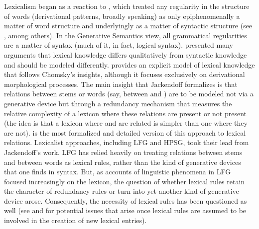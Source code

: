 \documentclass[output=paper
 	        ,biblatex
                ,babelshorthands
                ,newtxmath
                ,draftmode
                ,colorlinks, citecolor=brown
]{langscibook}
\begin{document}
Lexicalism began as a reaction to , which treated any regularity in the
structure of words (derivational patterns, broadly speaking) as only epiphenomenally a matter of
word structure and underlyingly as a matter of syntactic structure (see \citealt{Lakoff1970}, among
others). In the Generative Semantics view, all grammatical regularities are a matter of syntax (much
of it, in fact, logical syntax). \citet{Chomsky1970} presented many arguments that lexical knowledge
differs qualitatively from syntactic knowledge and should be modeled
differently. \citet{Jackendoff1975} provides an explicit model of lexical knowledge that follows Chomsky's
insights, although it focuses exclusively on derivational morphological processes. The main insight
that Jackendoff formalizes is that relations between stems  or words (say, between
 and ) are to be modeled not via a generative device but through a 
redundancy mechanism that measures the relative complexity of a lexicon where these relations are
present or not present (the idea is that a lexicon where  and 
are related is simpler than one where they are not). \citet{Bochner1993} is the most formalized and
detailed version of this approach to lexical relations. Lexicalist approaches, including
LFG and HPSG, took their lead from Jackendoff's work.  LFG
has relied heavily on treating relations between stems and between words as lexical rules, rather
than the kind of generative devices that one finds in syntax. But, as accounts of linguistic
phenomena in LFG focused increasingly on the lexicon, the question of whether lexical rules retain
the character of redundancy rules or turn into yet another kind of generative device arose.
Consequently, the necessity of lexical rules has been questioned as well (see
\citealt{KoenigandJurafsky1994} and \citealt[29--49]{Koenig1999c} for potential issues that arise
once lexical rules are assumed to be involved in the creation of new lexical entries).
\end{document}
